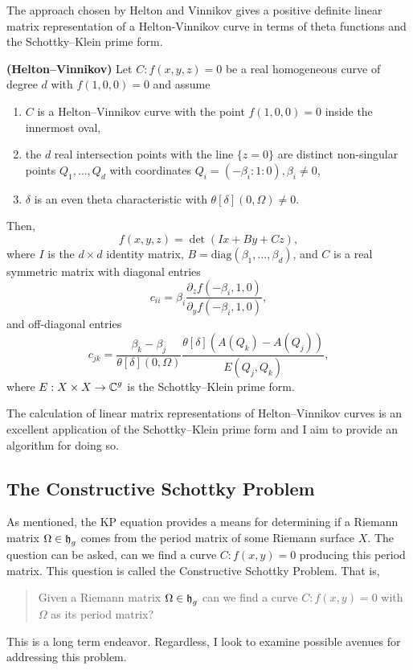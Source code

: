 The approach chosen by Helton and Vinnikov gives a positive definite
linear matrix representation of a Helton-Vinnikov curve in terms of
theta functions and the Schottky--Klein prime form.

\begin{theorem}
{\bf (Helton--Vinnikov)} Let $C : f(x,y,z) = 0$ be a real homogeneous
curve of degree $d$ with $f(1,0,0) = 0$ and assume
\begin{enumerate}
  \item $C$ is a Helton--Vinnikov curve with the point $f(1,0,0) = 0$
    inside the innermost oval,
  \item the $d$ real intersection points with the line $\{z = 0\}$ are
    distinct non-singular points $Q_1,\ldots,Q_d$ with coordinates $Q_i
    = (-\beta_i : 1 : 0), \beta_i \neq 0$,
  \item $\delta$ is an even theta characteristic with
    $\theta[\delta](0,\Omega) \neq 0$.
\end{enumerate}
Then,
\[
    f(x,y,z) = \det \left( Ix + By + Cz \right),
\]
where $I$ is the $d \times d$ identity matrix, $B =
\text{diag}(\beta_1,\ldots,\beta_d)$, and $C$ is a real symmetric matrix
with diagonal entries
\[
    c_{ii} = \beta_i
    \frac{\partial_z f(-\beta_i,1,0)}{\partial_y f(-\beta_i,1,0)},
\]
and off-diagonal entries
\[
    c_{jk} = \frac{\beta_k - \beta_j}{\theta[\delta](0,\Omega)}
    \frac{\theta[\delta](A(Q_k) - A(Q_j))}{E(Q_j,Q_k)},
\]
where $E : X \times X \to \operatorname{\mathbb{C}}^g$ is the Schottky--Klein prime form.
\end{theorem}

The calculation of linear matrix representations of Helton--Vinnikov
curves is an excellent application of the Schottky--Klein prime form and
I aim to provide an algorithm for doing so.


\subsection{The Constructive Schottky Problem}

As mentioned, the KP equation provides a means for determining if a
Riemann matrix $\Omega \in \operatorname{\mathfrak{h}}_g$ comes from the period matrix of some
Riemann surface $X$. The question can be asked, can we find a curve $C :
f(x,y) = 0$ producing this period matrix. This question is called the
Constructive Schottky Problem. That is,
\begin{quote}
  Given a Riemann matrix $\Omega \in \operatorname{\mathfrak{h}}_g$ can we find a curve $C :
  f(x,y) = 0$ with $\Omega$ as its period matrix?
\end{quote}
This is a long term endeavor. Regardless, I look to examine possible
avenues for addressing this problem.
